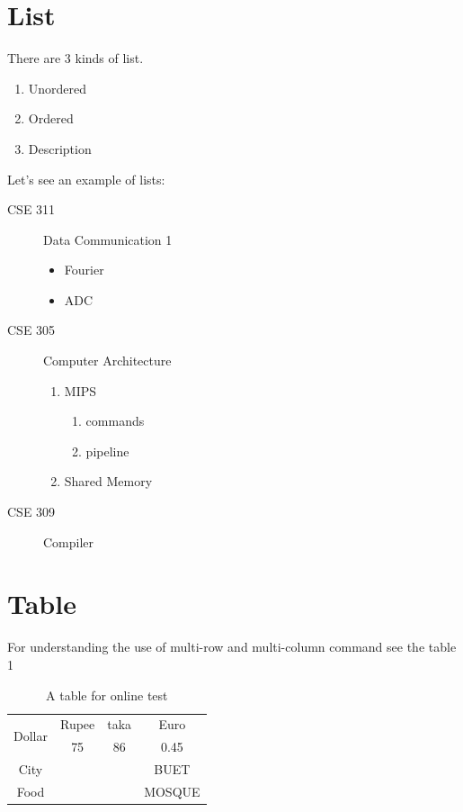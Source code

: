 \documentclass[14pt]{article}
\begin{document}
\section{List}
There are 3 kinds of list.
\begin{enumerate}[i]
    \item Unordered
    \item Ordered
    \item Description
\end{enumerate}
Let’s see an example of lists:
\begin{description}
    \item[CSE 311] Data Communication 1
    \begin{itemize}
        \item Fourier
        \item[] ADC
    \end{itemize}
    \item[CSE 305] Computer Architecture
    \begin{enumerate}
        \item MIPS
        \begin{enumerate}
        \item commands
        \item pipeline
        \end{enumerate}
        \item Shared Memory
    \end{enumerate}
    \item[CSE 309] Compiler
\end{description}
\section{Table}
For understanding the use of multi-row and multi-column command see the
table 1
\begin{table}[H]
    \centering
    \begin{tabular}{|c|c|c|c|}
       \hline
       \multirow{2}{*}{Dollar}  & Rupee & taka & Euro \\
	  \cline{2-4}
       & 75 & 86 & 0.45\\
	  \hline
	  City & \multicolumn{2}{|c}{{\multirow{3}{*}{Dhaka}}} & BUET\\
	  \cline{1-1}
	  \cline{4-4}
       Food & \multicolumn{2}{|c|}{} & MOSQUE\\
      \hline
    \end{tabular}
    \caption{  A table for online test}
\end{table}
\pagebreak
\end{document}
